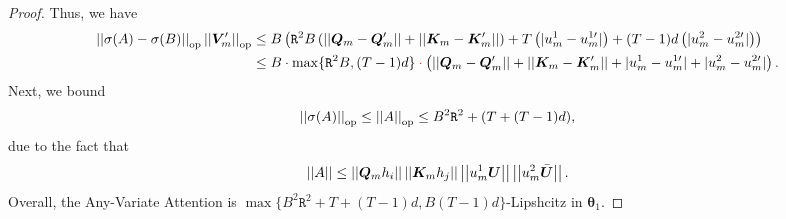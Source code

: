 \begin{proof}
    Thus, we have
    \begin{align*}
        \norm{\sigma(A) - \sigma(B)}_{\text{op}}
        \norm{\bV_m^\prime}_{\text{op}}
        &\leq
        B 
        \left( 
        \mathtt{R}^2 B
        \left(
        \norm{
        \bQ_m - \bQ_m^\prime
        }
        +
        \norm{
        \bK_m - \bK_m^\prime
        }
        \right)
        +
        T \left( \vert u^1_m - u_m^{1\prime} \vert  \right)
        +
        (T-1)d
        \left(
        \vert 
        u^2_m - u_m^{2 \prime}
        \vert
        \right)
        \right)
        \\
        &\leq
        B \cdot \max \{ \mathtt{R}^2 B, (T-1) d \}
        \mathcolor{red} \cdot
        \left(
        \norm{\bQ_m - \bQ^\prime_m}
        +
        \norm{\bK_m - \bK^\prime_m}
        +
        \vert u^1_m - u_m^{1\prime} \vert 
        +
        \vert u^2_m - u_m^{2 \prime} \vert 
        \right)
        .
    \end{align*}
    Next, we bound
    \begin{align*}
        \left\lvert \left\lvert\sigma(A)\right\rvert \right\rvert_{\text{op}}
        \leq
        \left\lvert \left\lvert
        A
        \right\rvert \right\rvert_{\text{op}}
        \leq
        B^2 \mathtt{R}^2 + ( T + (T-1)d ),
    \end{align*}
    due to the fact that 
    \[
    \left\lvert \left\lvert A\right\rvert \right\rvert
    \leq
    \left\lvert \left\lvert
    \bm{Q}_m h_i
    \right\rvert \right\rvert
    \left\lvert \left\lvert
    \bm{K}_m h_j
    \right\rvert \right\rvert
    \left\lvert \left\lvert
    u^1_m \bm{U}
    \right\rvert \right\rvert
    \left\lvert \left\lvert
    u^2_m \bar{\bm{U}}
    \right\rvert \right\rvert.
    \]
    Overall, the Any-Variate Attention is 
    $
    \max \{  B^2\mathtt{R}^2 +T + (T-1)d, B(T-1)d  \}
    $-Lipshcitz in $\bm{\theta}_1$.
\end{proof}

